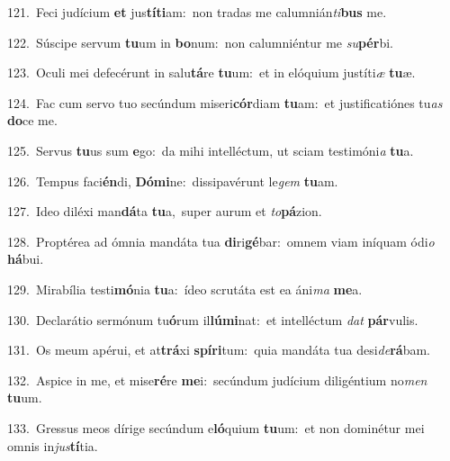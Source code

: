 {\numbfont\textcolor{\numbcolor}{121.}}~Feci judícium \textbf{et} jus\-\textbf{tí}\-\textbf{ti}am:~\star non tradas me calumnián\-\textit{ti}\-\textbf{bus} me.\par
{\numbfont\textcolor{\numbcolor}{122.}}~Súscipe servum \textbf{tu}\-um in \textbf{bo}\-num:~\star non calumniéntur me \textit{su}\-\textbf{pér}bi.\par
{\numbfont\textcolor{\numbcolor}{123.}}~Oculi mei defecérunt in salu\-\textbf{tá}\-re \textbf{tu}\-um:~\star et in elóquium justíti\textit{æ} \textbf{tu}\-æ.\par
{\numbfont\textcolor{\numbcolor}{124.}}~Fac cum servo tuo secúndum miseri\-\textbf{cór}\-diam \textbf{tu}\-am:~\star et justificatiónes tu\textit{as} \textbf{do}\-ce me.\par
{\numbfont\textcolor{\numbcolor}{125.}}~Servus \textbf{tu}\-us sum \textbf{e}\-go:~\star da mihi intelléctum, ut sciam testimóni\textit{a} \textbf{tu}\-a.\par
{\numbfont\textcolor{\numbcolor}{126.}}~Tempus faci\-\textbf{én}\-di, \textbf{Dó}\-\textbf{mi}ne:~\star dissipavérunt le\textit{gem} \textbf{tu}\-am.\par
{\numbfont\textcolor{\numbcolor}{127.}}~Ideo diléxi man\-\textbf{dá}\-ta \textbf{tu}\-a,~\star super aurum et \textit{to}\-\textbf{pá}zion.\par
{\numbfont\textcolor{\numbcolor}{128.}}~Proptérea ad ómnia mandáta tua \textbf{di}\-ri\-\textbf{gé}\-bar:~\star omnem viam iníquam ódi\textit{o} \textbf{há}\-bui.\par
{\numbfont\textcolor{\numbcolor}{129.}}~Mirabília testi\-\textbf{mó}\-nia \textbf{tu}\-a:~\star ídeo scrutáta est ea áni\textit{ma} \textbf{me}\-a.\par
{\numbfont\textcolor{\numbcolor}{130.}}~Declarátio sermónum tu\-\textbf{ó}\-rum il\-\textbf{lú}\-\textbf{mi}nat:~\star et intelléctum \textit{dat} \textbf{pár}\-vulis.\par
{\numbfont\textcolor{\numbcolor}{131.}}~Os meum apérui, et at\-\textbf{trá}\-xi \textbf{spí}\-\textbf{ri}tum:~\star quia mandáta tua desi\-\textit{de}\-\textbf{rá}bam.\par
{\numbfont\textcolor{\numbcolor}{132.}}~Aspice in me, et mise\-\textbf{ré}\-re \textbf{me}\-i:~\star secúndum judícium diligéntium no\textit{men} \textbf{tu}\-um.\par
{\numbfont\textcolor{\numbcolor}{133.}}~Gressus meos dírige secúndum e\-\textbf{ló}\-quium \textbf{tu}\-um:~\star et non dominétur mei omnis in\-\textit{jus}\-\textbf{tí}tia.\par
